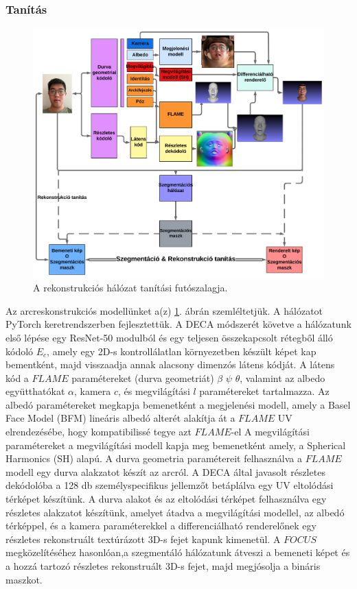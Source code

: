 \documentclass[12pt,a4]{article}
\begin{document}
\subsubsection{Tanítás}
    \begin{figure}[h]	
		\centering
		\includegraphics[width=1\linewidth]{pipelinehun}
		\caption{  A rekonstrukciós hálózat tanítási futószalagja.}
        \label{fig:pipeline}
	\end{figure}
 
	Az arcreskonstrukciós modellünket a(z) \ref{fig:pipeline}. ábrán szemléltetjük. A hálózatot PyTorch
	keretrendszerben fejlesztettük.
	A DECA módszerét követve a hálózatunk első lépése egy
	ResNet-50 modulból és egy teljesen összekapcsolt rétegből álló kódoló
	$E_{c}$, amely egy 2D-s kontrollálatlan környezetben készült képet kap bementként, majd visszaadja annak alacsony dimenzós látens kódját. A látens kód a $FLAME$
	paramétereket (durva geometriát) $\beta$ $\psi$ $\theta$, valamint az albedo együtthatókat
	$\alpha$, kamera $c$, és megvilágítási $l$ paramétereket tartalmazza.
	Az albedó paramétereket megkapja
	bemenetként a megjelenési modell, amely a Basel Face Model (BFM)
	lineáris albedó alterét alakítja át a $FLAME$ UV elrendezésébe,
	hogy kompatibilissé tegye azt $FLAME$-el A megvilágítási paramétereket
	a megvilágítási modell kapja meg bemenetként amely,
	a Spherical Harmonics (SH) alapú. A durva geometria
	paramétereit felhasználva a $FLAME$ modell egy durva alakzatot készít az
	arcról. A DECA által javasolt részletes dekódolóba a 128 db személyspecifikus jellemzőt betáplálva egy UV eltolódási térképet készítünk. A durva alakot és az eltolódási térképet felhasználva egy részletes alakzatot készítünk, amelyet átadva a megvilágítási modellel,
	az albedó térképpel, és a kamera paraméterekkel a differenciálható renderelőnek egy részletes rekonstruált textúrázott 3D-s fejet kapunk kimenetül.
	A $FOCUS$ megközelítéséhez hasonlóan,a szegmentáló hálózatunk átveszi
	a bemeneti képet és a hozzá tartozó részletes rekonstruált 3D-s fejet, majd
	megjósolja a bináris maszkot.
\end{document}
